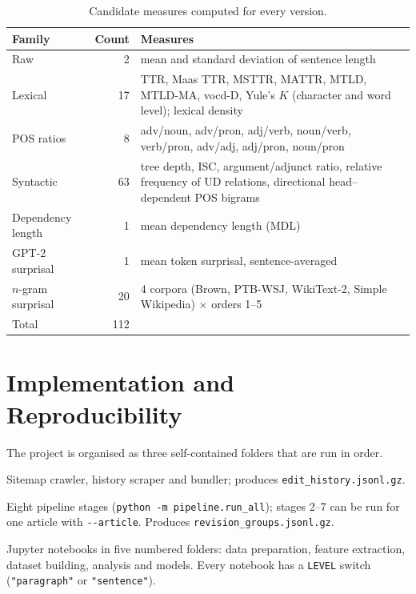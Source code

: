 \documentclass[12pt,a4paper,oneside]{report}
\begin{document}
\begin{table}[ht]
\centering
\small
\caption{Candidate measures computed for every version.}
\label{tab:inventory}
\begin{tabularx}{\textwidth}{@{}lrX@{}}
\toprule
Family & Count & Measures\\
\midrule
Raw & 2 & mean and standard deviation of sentence length\\
Lexical & 17 & TTR, Maas TTR, MSTTR, MATTR, MTLD, MTLD-MA, vocd-D, Yule's $K$ (character and word level); lexical density\\
POS ratios & 8 & adv/noun, adv/pron, adj/verb, noun/verb, verb/pron, adv/adj, adj/pron, noun/pron\\
Syntactic & 63 & tree depth, ISC, argument/adjunct ratio, relative frequency of UD relations, directional head--dependent POS bigrams\\
Dependency length & 1 & mean dependency length (MDL)\\
GPT-2 surprisal & 1 & mean token surprisal, sentence-averaged\\
$n$-gram surprisal & 20 & 4 corpora (Brown, PTB-WSJ, WikiText-2, Simple Wikipedia) $\times$ orders 1--5\\
\midrule
Total & 112 & \\
\bottomrule
\end{tabularx}
\end{table}

\chapter{Implementation and Reproducibility}
\label{app:repro}
The project is organised as three self-contained folders that are run in order.
{\raggedright
\begin{description}[style=nextline, leftmargin=1.5em]
  \item[\texttt{data-collection/}] Sitemap crawler, history scraper and bundler; produces \texttt{edit\_history.jsonl.gz}.
  \item[\texttt{data-preprocessing/}] Eight pipeline stages (\texttt{python -m pipeline.run\_all}); stages 2--7 can be run for one article with \texttt{-{}-article}. Produces \texttt{revision\_groups.jsonl.gz}.
  \item[\texttt{experiments/}] Jupyter notebooks in five numbered folders: data preparation, feature extraction, dataset building, analysis and models. Every notebook has a \texttt{LEVEL} switch (\texttt{"paragraph"} or \texttt{"sentence"}).
\end{description}
\par}
\end{document}
